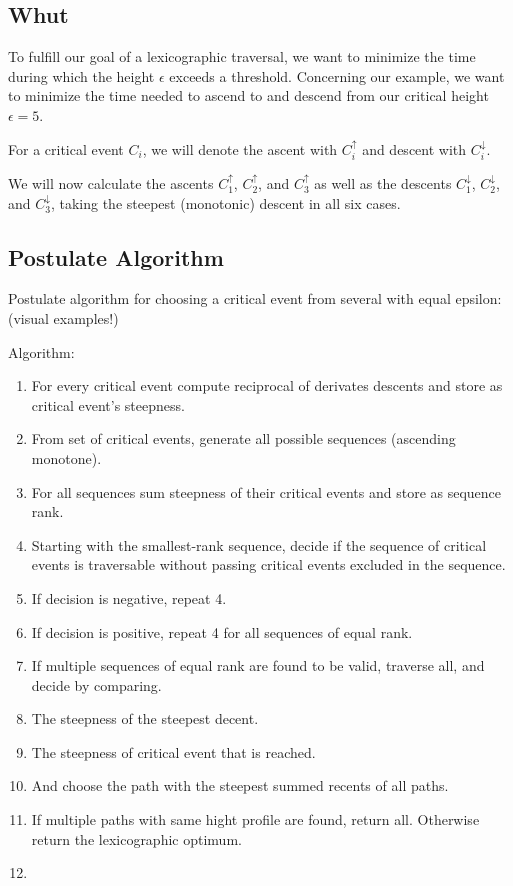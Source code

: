 \subsection{Whut}

To fulfill our goal of a lexicographic traversal, we want to minimize the time during which the height $\epsilon$ exceeds a threshold.\cite{rotelex} Concerning our example, we want to minimize the time needed to ascend to and descend from our critical height $\epsilon = 5$. 

For a critical event $C_i$, we will denote the ascent with $C_i^\uparrow$ and descent with $C_i^\downarrow$.

We will now calculate the ascents $C_1^\uparrow$, $C_2^\uparrow$, and $C_3^\uparrow$ as well as the descents $C_1^\downarrow$, $C_2^\downarrow$, and $C_3^\downarrow$, taking the steepest (monotonic) descent in all six cases.


\subsection{Postulate Algorithm}
Postulate algorithm for choosing a critical event from several with equal epsilon: (visual examples!)

Algorithm:
\begin{enumerate}
	\item For every critical event compute reciprocal of derivates descents and store as critical event's steepness.
	\item From set of critical events, generate all possible sequences (ascending monotone).
	\item For all sequences sum steepness of their critical events and store as sequence rank.
	\item Starting with the smallest-rank sequence, decide if the sequence of critical events is traversable without passing critical events excluded in the sequence.
	\item If decision is negative, repeat 4.
	\item If decision is positive, repeat 4 for all sequences of equal rank.
	\item If multiple sequences of equal rank are found to be valid, traverse all, and decide by comparing.
	\item The steepness of the steepest decent.
	\item The steepness of critical event that is reached.
	\item And choose the path with the steepest summed recents of all paths.
	\item If multiple paths with same hight profile are found, return all. Otherwise return the lexicographic optimum.
	\item 
\end{enumerate}

